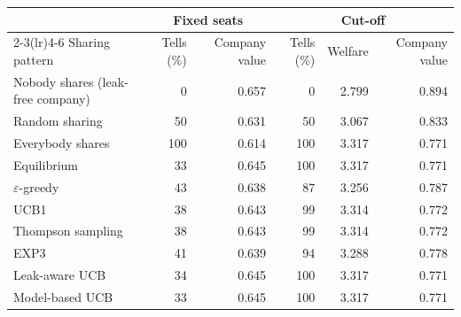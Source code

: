 \begin{tabular}{@{}lrrrrr@{}}
\toprule
 & \multicolumn{2}{c}{Fixed seats} & \multicolumn{3}{c}{Cut-off} \\
\cmidrule(lr){2-3}\cmidrule(lr){4-6}
Sharing pattern & Tells (\%) & Company value & Tells (\%) & Welfare & Company value \\
\midrule
Nobody shares (leak-free company) & 0 & 0.657 & 0 & 2.799 & 0.894 \\
Random sharing & 50 & 0.631 & 50 & 3.067 & 0.833 \\
Everybody shares & 100 & 0.614 & 100 & 3.317 & 0.771 \\
Equilibrium & 33 & 0.645 & 100 & 3.317 & 0.771 \\
\midrule
$\varepsilon$-greedy & 43 & 0.638 & 87 & 3.256 & 0.787 \\
UCB1 & 38 & 0.643 & 99 & 3.314 & 0.772 \\
Thompson sampling & 38 & 0.643 & 99 & 3.314 & 0.772 \\
EXP3 & 41 & 0.639 & 94 & 3.288 & 0.778 \\
Leak-aware UCB & 34 & 0.645 & 100 & 3.317 & 0.771 \\
Model-based UCB & 33 & 0.645 & 100 & 3.317 & 0.771 \\
\bottomrule
\end{tabular}
